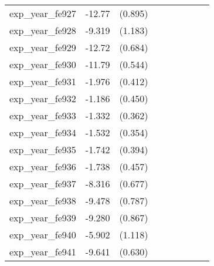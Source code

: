{\begin{tabular}{l*{4}{cc}}
exp\_year\_fe927&   -12.77\sym{***}&  (0.895)&                  &         &                  &         &                  &         \\
exp\_year\_fe928&   -9.319\sym{***}&  (1.183)&                  &         &                  &         &                  &         \\
exp\_year\_fe929&   -12.72\sym{***}&  (0.684)&                  &         &                  &         &                  &         \\
exp\_year\_fe930&   -11.79\sym{***}&  (0.544)&                  &         &                  &         &                  &         \\
exp\_year\_fe931&   -1.976\sym{***}&  (0.412)&                  &         &                  &         &                  &         \\
exp\_year\_fe932&   -1.186\sym{**} &  (0.450)&                  &         &                  &         &                  &         \\
exp\_year\_fe933&   -1.332\sym{***}&  (0.362)&                  &         &                  &         &                  &         \\
exp\_year\_fe934&   -1.532\sym{***}&  (0.354)&                  &         &                  &         &                  &         \\
exp\_year\_fe935&   -1.742\sym{***}&  (0.394)&                  &         &                  &         &                  &         \\
exp\_year\_fe936&   -1.738\sym{***}&  (0.457)&                  &         &                  &         &                  &         \\
exp\_year\_fe937&   -8.316\sym{***}&  (0.677)&                  &         &                  &         &                  &         \\
exp\_year\_fe938&   -9.478\sym{***}&  (0.787)&                  &         &                  &         &                  &         \\
exp\_year\_fe939&   -9.280\sym{***}&  (0.867)&                  &         &                  &         &                  &         \\
exp\_year\_fe940&   -5.902\sym{***}&  (1.118)&                  &         &                  &         &                  &         \\
exp\_year\_fe941&   -9.641\sym{***}&  (0.630)&                  &         &                  &         &                  &         \\

\end{tabular}}
